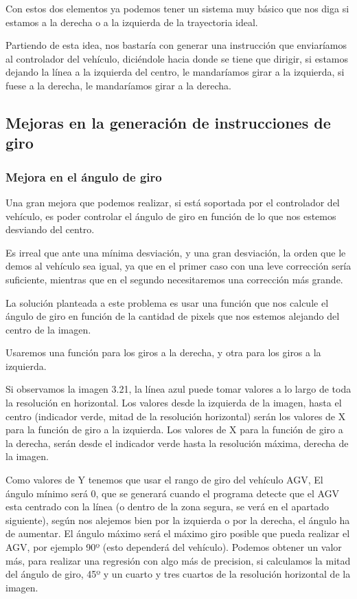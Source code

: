 Con estos dos elementos ya podemos tener un sistema muy básico que nos diga si estamos a la derecha o a la izquierda de la trayectoria ideal.

Partiendo de esta idea, nos bastaría con generar una instrucción que enviaríamos al controlador del vehículo, diciéndole hacia donde se tiene que dirigir, si estamos dejando la línea a la izquierda del centro, le mandaríamos girar a la izquierda, si fuese a la derecha, le mandaríamos girar a la derecha.

\subsection{Mejoras en la generación de instrucciones de giro}

\subsubsection{Mejora en el ángulo de giro}
Una gran mejora que podemos realizar, si está soportada por el controlador del vehículo, es poder controlar el ángulo de giro en función de lo que nos estemos desviando del centro. 

Es irreal que ante una mínima desviación, y una gran desviación, la orden que le demos al vehículo sea igual, ya que en el primer caso con una leve corrección sería suficiente, mientras que en el segundo necesitaremos una corrección más grande.

La solución planteada a este problema es usar una función que nos calcule el ángulo de giro en función de la cantidad de pixels que nos estemos alejando del centro de la imagen. 

Usaremos una función para los giros a la derecha, y otra para los giros a la izquierda.

Si observamos la imagen 3.21, la línea azul puede tomar valores a lo largo de toda la resolución en horizontal. Los valores desde la izquierda de la imagen, hasta el centro (indicador verde, mitad de la resolución horizontal) serán los valores de X para la función de giro a la izquierda. Los valores de X para la función de giro a la derecha, serán desde el indicador verde hasta la resolución máxima, derecha de la imagen.

Como valores de Y tenemos que usar el rango de giro del vehículo AGV, El ángulo mínimo será 0, que se generará cuando el programa detecte que el AGV esta centrado con la línea (o dentro de la zona segura, se verá en el apartado siguiente), según nos alejemos bien por la izquierda o por la derecha, el ángulo ha de aumentar. El ángulo máximo será el máximo giro posible que pueda realizar el AGV, por ejemplo 90º (esto dependerá del vehículo). Podemos obtener un valor más, para realizar una regresión con algo más de precision, si calculamos la mitad del ángulo de giro, 45º y un cuarto y tres cuartos de la resolución horizontal de la imagen. 

